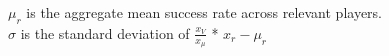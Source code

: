\documentclass[preview]{standalone}
\begin{document}
\begin{center}
$\mu_r$ is the aggregate mean success rate across relevant players. \\$\sigma$ is the standard deviation of $\frac{x_V}{x_\mu}$ * $x_r - \mu_r$
\end{center}
\end{document}
